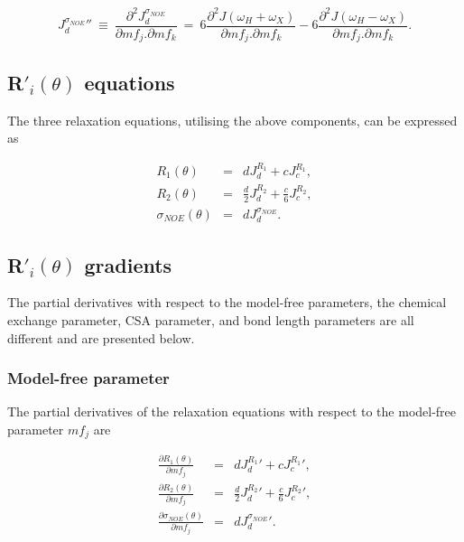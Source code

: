 \begin{equation}
    {J_d^{\sigma_{NOE}}}'' \ \equiv \ \frac{\partial^2 J_d^{\sigma_{NOE}}}{\partial mf_j . \partial mf_k}
        \ = \ 6 \frac{\partial^2 J(\omega_H + \omega_X)}{\partial mf_j . \partial mf_k}
        - 6 \frac{\partial^2 J(\omega_H - \omega_X)}{\partial mf_j . \partial mf_k}.  \label{eq: J terms: JsigmaNOEd"}
\end{equation}




\subsection{R$'_i(\theta)$ equations}

The three relaxation equations, utilising the above components, can be expressed as

\begin{eqnarray}
    R_1(\theta) & = & d J_d^{R_1} + c J_c^{R_1},                        \label{eq: Ri': R1} \\
    R_2(\theta) & = & \frac{d}{2} J_d^{R_2} + \frac{c}{6} J_c^{R_2},    \label{eq: Ri': R2} \\
    \sigma_{NOE}(\theta) & = & d J_d^{\sigma_{NOE}}.                    \label{eq: Ri': sigmaNOE}
\end{eqnarray}




\subsection{R$'_i(\theta)$ gradients}

The partial derivatives with respect to the model-free parameters, the chemical exchange parameter, CSA parameter, and bond length parameters are all different and are presented below.


\subsubsection{Model-free parameter}

The partial derivatives of the relaxation equations with respect to the model-free parameter $mf_j$ are

\begin{eqnarray}
    \frac{\partial R_1(\theta)}{\partial mf_j} & = & d {J_d^{R_1}}' + c {J_c^{R_1}}',                       \label{eq: Ri': dR1/dmf} \\
    \frac{\partial R_2(\theta)}{\partial mf_j} & = & \frac{d}{2} {J_d^{R_2}}' + \frac{c}{6} {J_c^{R_2}}',   \label{eq: Ri': dR2/dmf} \\
    \frac{\partial \sigma_{NOE}(\theta)}{\partial mf_j} & = & d {J_d^{\sigma_{NOE}}}'.                    \label{eq: Ri': dsigmaNOE/dmf}
\end{eqnarray}


